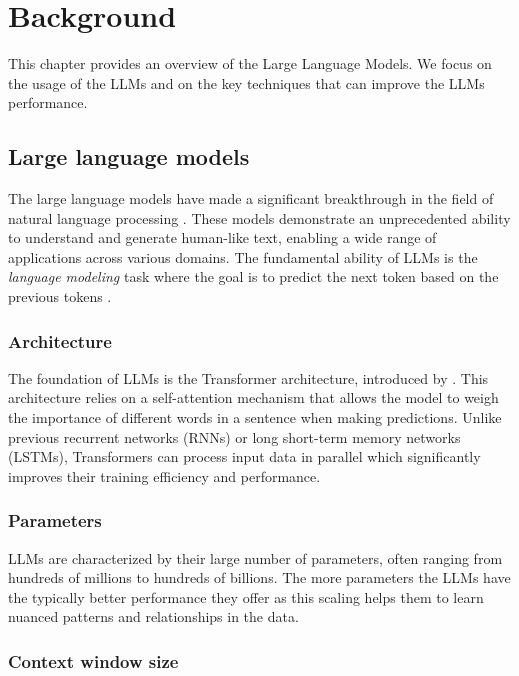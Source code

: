 \chapter{Background}
\label{chap:background}

This chapter provides an overview of the Large Language Models. We focus on the usage of the LLMs and on the key techniques that can improve the LLMs performance.


\section{Large language models}

The large language models have made a significant breakthrough in the field of natural language processing \cite{Peters2018,Devlin2019,Brown2020}.
These models demonstrate an unprecedented ability to understand and generate human-like text, enabling a wide range of applications across various domains. The fundamental ability of LLMs is the \emph{language modeling} task where the goal is to predict the next token based on the previous tokens \cite{Bengio2000}.


\subsection{Architecture}

The foundation of LLMs is the Transformer architecture, introduced by \citet{Vaswani2017}. This architecture relies on a self-attention mechanism that allows the model to weigh the importance of different words in a sentence when making predictions. Unlike previous recurrent networks (RNNs) or long short-term memory networks (LSTMs), Transformers can process input data in parallel which significantly improves their training efficiency and performance.


\subsection{Parameters}

LLMs are characterized by their large number of parameters, often ranging from hundreds of millions to hundreds of billions. The more parameters the LLMs have the typically better performance they offer \cite{Kaplan2020} as this scaling helps them to learn nuanced patterns and relationships in the data.


\subsection{Context window size}

